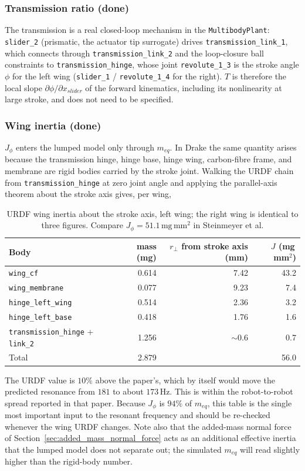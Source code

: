 \documentclass{article}
\begin{document}
\subsubsection{Transmission ratio (done)}
The transmission is a real closed-loop mechanism in the \texttt{MultibodyPlant}: \texttt{slider\_2} (prismatic, the actuator tip surrogate) drives \texttt{transmission\_link\_1}, which connects through \texttt{transmission\_link\_2} and the loop-closure ball constraints to \texttt{transmission\_hinge}, whose joint \texttt{revolute\_1\_3} is the stroke angle \(\phi\) for the left wing (\texttt{slider\_1} / \texttt{revolute\_1\_4} for the right). \(T\) is therefore the local slope \(\partial\phi/\partial x_{slider}\) of the forward kinematics, including its nonlinearity at large stroke, and does not need to be specified.

\subsubsection{Wing inertia (done)}
\(J_\phi\) enters the lumped model only through \(m_{eq}\). In Drake the same quantity arises because the transmission hinge, hinge base, hinge wing, carbon-fibre frame, and membrane are rigid bodies carried by the stroke joint. Walking the URDF chain from \texttt{transmission\_hinge} at zero joint angle and applying the parallel-axis theorem about the stroke axis gives, per wing,
\begin{table}[H]
\centering
\begin{tabular}{l r r r}
\hline
Body & mass (mg) & \(r_\perp\) from stroke axis (mm) & \(J\) (mg\,mm\(^2\)) \\
\hline
\texttt{wing\_cf} & 0.614 & 7.42 & 43.2 \\
\texttt{wing\_membrane} & 0.077 & 9.23 & 7.4 \\
\texttt{hinge\_left\_wing} & 0.514 & 2.36 & 3.2 \\
\texttt{hinge\_left\_base} & 0.418 & 1.76 & 1.6 \\
\texttt{transmission\_hinge} + \texttt{link\_2} & 1.256 & \(\sim\)0.6 & 0.7 \\
\hline
Total & 2.879 & & 56.0 \\
\hline
\end{tabular}
\caption{URDF wing inertia about the stroke axis, left wing; the right wing is identical to three figures. Compare \(J_\phi = 51.1\,\mathrm{mg\,mm^2}\) in Steinmeyer et al.}
\label{tab:stroke_inertia}
\end{table}
The URDF value is \(10\%\) above the paper's, which by itself would move the predicted resonance from \(181\) to about \(173\,\mathrm{Hz}\). This is within the robot-to-robot spread reported in that paper. Because \(J_\phi\) is \(94\%\) of \(m_{eq}\), this table is the single most important input to the resonant frequency and should be re-checked whenever the wing URDF changes. Note also that the added-mass normal force of Section~\ref{sec:added_mass_normal_force} acts as an additional effective inertia that the lumped model does not separate out; the simulated \(m_{eq}\) will read slightly higher than the rigid-body number.
\end{document}
